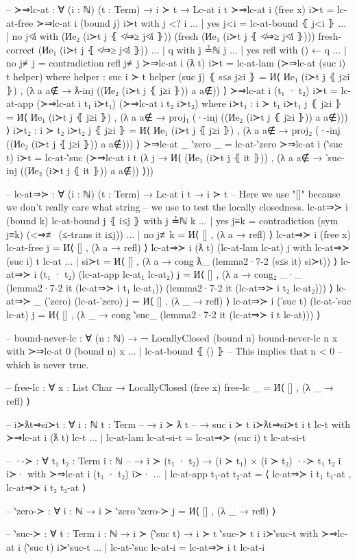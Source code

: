 \documentclass[logo,bsc,singlespacing,parskip,online]{infthesis}
\renewenvironment{code}{\mintedcopy[breaklines,breaksymbolleft=\;]{agda}}{\endmintedcopy}
\begin{document}
\begin{code}
-- ≻⇒lc-at : ∀ (i : ℕ) (t : Term) → i ≻ t → Lc-at i t
≻⇒lc-at i (free x) i≻t = lc-at-free
≻⇒lc-at i (bound j) i≻t with j <? i
... | yes j<i = lc-at-bound ⦃ j<i ⦄
... | no  j≮i with
  (Иe₂ (i≻t j ⦃ ≮⇒≥ j≮i ⦄))
    (fresh (Иe₁ (i≻t j ⦃ ≮⇒≥ j≮i ⦄)))
    {fresh-correct (Иe₁ (i≻t j ⦃ ≮⇒≥ j≮i ⦄))}
...   | q with j ≟ℕ j
...     | yes refl with () ← q
...     | no  j≢j  = contradiction refl j≢j
≻⇒lc-at i (ƛ t) i≻t = lc-at-lam (≻⇒lc-at (suc i) t helper)
  where
    helper : suc i ≻ t
    helper (suc j) ⦃ s≤s j≥i ⦄ =
      И⟨ Иe₁ (i≻t j ⦃ j≥i ⦄)
      , (λ a {a∉} → ƛ-inj ((Иe₂ (i≻t j ⦃ j≥i ⦄)) a {a∉})) ⟩
≻⇒lc-at i (t₁ · t₂) i≻t =
  lc-at-app (≻⇒lc-at i t₁ i≻t₁) (≻⇒lc-at i t₂ i≻t₂)
  where
    i≻t₁ : i ≻ t₁
    i≻t₁ j ⦃ j≥i ⦄ =
      И⟨ Иe₁ (i≻t j ⦃ j≥i ⦄)
      , (λ a {a∉} → proj₁ (·-inj ((Иe₂ (i≻t j ⦃ j≥i ⦄)) a {a∉})))
      ⟩
    i≻t₂ : i ≻ t₂
    i≻t₂ j ⦃ j≥i ⦄ =
      И⟨ Иe₁ (i≻t j ⦃ j≥i ⦄)
      , (λ a {a∉} → proj₂ (·-inj ((Иe₂ (i≻t j ⦃ j≥i ⦄)) a {a∉})))
      ⟩
≻⇒lc-at _ ‵zero _ = lc-at-‵zero
≻⇒lc-at i (‵suc t) i≻t = lc-at-‵suc (≻⇒lc-at i t (λ j →
  И⟨ (Иe₁ (i≻t j ⦃ it ⦄))
  , (λ a {a∉} → ‵suc-inj ((Иe₂ (i≻t j ⦃ it ⦄)) a {a∉})) ⟩))

-- lc-at⇒≻ : ∀ (i : ℕ) (t : Term) → Lc-at i t → i ≻ t
-- Here we use "[]" because we don't really care what string
-- we use to test the locally closedness.
lc-at⇒≻ i (bound k) lc-at-bound j ⦃ i≤j ⦄ with j ≟ℕ k
... | yes j≡k = contradiction (sym j≡k) (<⇒≢ (≤-trans it i≤j))
... | no  j≢k = И⟨ [] , (λ a → refl) ⟩
lc-at⇒≻ i (free x) lc-at-free j = И⟨ [] , (λ a → refl) ⟩
lc-at⇒≻ i (ƛ t) (lc-at-lam lc-at) j
  with lc-at⇒≻ (suc i) t lc-at
... | si≻t = И⟨ [] , (λ a → cong ƛ_ (lemma2·7-2 (s≤s it) si≻t)) ⟩
lc-at⇒≻ i (t₁ · t₂) (lc-at-app lc-at₁ lc-at₂) j =
  И⟨ []
  , (λ a → cong₂ _·_
      (lemma2·7-2 it (lc-at⇒≻ i t₁ lc-at₁))
      (lemma2·7-2 it (lc-at⇒≻ i t₂ lc-at₂))) ⟩
lc-at⇒≻ _ (‵zero) (lc-at-‵zero) j = И⟨ [] , (λ _ → refl) ⟩
lc-at⇒≻ i (‵suc t) (lc-at-‵suc lc-at) j =
  И⟨ []
  , (λ _ → cong ‵suc_ (lemma2·7-2 it (lc-at⇒≻ i t lc-at))) ⟩

-- bound-never-lc : ∀ (n : ℕ) → ¬ LocallyClosed (bound n)
bound-never-lc n x with ≻⇒lc-at 0 (bound n) x
... | lc-at-bound ⦃ () ⦄ -- This implies that n < 0
                         -- which is never true.

-- free-lc : ∀ {x : List Char} → LocallyClosed (free x)
free-lc _ = И⟨ [] , (λ _ → refl) ⟩

-- i≻ƛt⇒si≻t : ∀ {i : ℕ} {t : Term}
--   → i ≻ ƛ t
--   → suc i ≻ t
i≻ƛt⇒si≻t {i} {t} lc-t with ≻⇒lc-at i (ƛ t) lc-t
... | lc-at-lam lc-at-si-t = lc-at⇒≻ (suc i) t lc-at-si-t

-- ·-≻ : ∀ {t₁ t₂ : Term} {i : ℕ}
--   → i ≻ (t₁ · t₂) → (i ≻ t₁) × (i ≻ t₂)
·-≻ {t₁} {t₂} {i} i≻· with ≻⇒lc-at i (t₁ · t₂) i≻·
... | lc-at-app t₁-at t₂-at =
  ⟨ lc-at⇒≻ i t₁ t₁-at
  , lc-at⇒≻ i t₂ t₂-at ⟩

-- ‵zero-≻ : ∀ {i : ℕ} → i ≻ ‵zero
‵zero-≻ j = И⟨ [] , (λ _ → refl) ⟩

-- ‵suc-≻ : ∀ {t : Term} {i : ℕ} → i ≻ (‵suc t) → i ≻ t
‵suc-≻ {t} {i} i≻‵suc-t with ≻⇒lc-at i (‵suc t) i≻‵suc-t
... | lc-at-‵suc lc-at-i = lc-at⇒≻ i t lc-at-i
\end{code}
\end{document}

